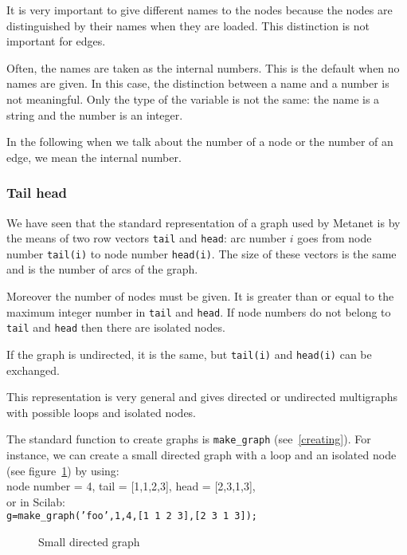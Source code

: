 \documentclass[11pt]{article}
\newcommand{\func}[1]{\texttt{#1}}
\begin{document}
It is very important to give different names to the nodes because the
nodes are distinguished by their names when they are loaded. This
distinction is not important for edges.

Often, the names are taken as the internal numbers. This is
the default when no names are given. In this case, the distinction
between a name and a number is not meaningful. Only the type of the
variable is not the same: the name is a string and the number is an integer.

In the following when
we talk about the number of a node or the number of an edge, we mean
the internal number.

\subsubsection{Tail head}

We have seen that the standard representation of a graph used by
Metanet is by the means of two row vectors
\texttt{tail} and
\texttt{head}:
arc number $i$ goes from node
number \texttt{tail(i)} to node number \texttt{head(i)}.
The size of these vectors is the same and is the number of arcs of the
graph.

Moreover the number of nodes must be given. It is greater than or
equal to the maximum integer number in \texttt{tail} and
\texttt{head}. If node numbers do not belong to \texttt{tail} and
\texttt{head} then there are isolated nodes.

If the graph is undirected, it is the same, but \texttt{tail(i)} and
\texttt{head(i)} can be exchanged.

This representation is very general and gives directed or undirected
multigraphs with possible loops and isolated nodes.

The standard function to create graphs is \func{make\_graph}
(see~\ref{creating}). 
For instance, we can create a small directed graph with a loop and an
isolated  node (see figure~\ref{fig-foo}) by using:\\
node number = 4, tail = [1,1,2,3], head = [2,3,1,3],\\
or in Scilab:\\
\texttt{g=make\_graph('foo',1,4,[1 1 2 3],[2 3 1 3]);}

\begin{figure}
 \begin{center}\end{center}
 \caption{Small directed graph}
 \label{fig-foo}
\end{figure}
\end{document}

